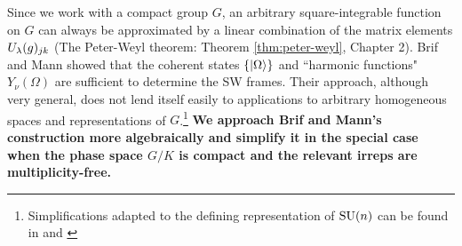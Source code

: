Since we work with a compact group $G$, an arbitrary square-integrable function on $G$ can always be approximated by a linear combination of the matrix elements $U_{\lambda}(g)_{jk}$ (The Peter-Weyl theorem: Theorem \ref{thm:peter-weyl}, Chapter 2). Brif and Mann showed that the coherent states $\{ {\left\vert{\Omega}\right\rangle} \}$ and ``harmonic functions" $Y_{\nu}(\Omega)$ are sufficient to determine the SW frames. Their approach, although very general, does not lend itself easily to applications to arbitrary homogeneous spaces and representations of $G$.\footnote{Simplifications adapted to the defining representation of $\text{SU}(n)$ can be found in \cite{klimov_general_2010} and \cite{tilma_sun-symmetric_2012}}
{\bf We approach Brif and Mann's construction more algebraically and simplify it in the special case when the phase space $G/K$ is compact and the relevant irreps are multiplicity-free.}


